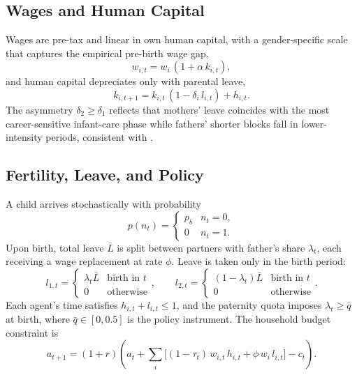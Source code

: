 \subsection*{Wages and Human Capital}

Wages are pre-tax and linear in own human capital, with a gender-specific scale that captures the empirical pre-birth wage gap,
\begin{equation}
    w_{i,t} = w_i\,(1 + \alpha\, k_{i,t}),
\end{equation}
and human capital depreciates only with parental leave,
\begin{equation}
    k_{i,t+1} = k_{i,t}\,(1 - \delta_i\, l_{i,t}) + h_{i,t}.
\end{equation}
The asymmetry $\delta_2 \geq \delta_1$ reflects that mothers' leave coincides with the most career-sensitive infant-care phase while fathers' shorter blocks fall in lower-intensity periods, consistent with \citet{kleven2019children}.

\subsection*{Fertility, Leave, and Policy}

A child arrives stochastically with probability
\begin{equation}
    p(n_t) = \begin{cases} p_b & n_t = 0,\\ 0 & n_t = 1.\end{cases}
\end{equation}
Upon birth, total leave $\bar{L}$ is split between partners with father's share $\lambda_t$, each receiving a wage replacement at rate $\phi$. Leave is taken only in the birth period:
\begin{equation}
    l_{1,t} = \begin{cases}\lambda_t \bar{L} & \text{birth in } t\\ 0 & \text{otherwise}\end{cases},\qquad
    l_{2,t} = \begin{cases}(1-\lambda_t) \bar{L} & \text{birth in } t\\ 0 & \text{otherwise}\end{cases}.
\end{equation}
Each agent's time satisfies $h_{i,t} + l_{i,t} \leq 1$, and the paternity quota imposes $\lambda_t \geq \bar{q}$ at birth, where $\bar{q} \in [0, 0.5]$ is the policy instrument. The household budget constraint is
\begin{equation}
    a_{t+1} = (1+r)\!\left(a_t + \sum_{i}\!\bigl[(1-\tau_t)\,w_{i,t}\,h_{i,t} + \phi\, w_i\, l_{i,t}\bigr] - c_t\right).
\end{equation}

